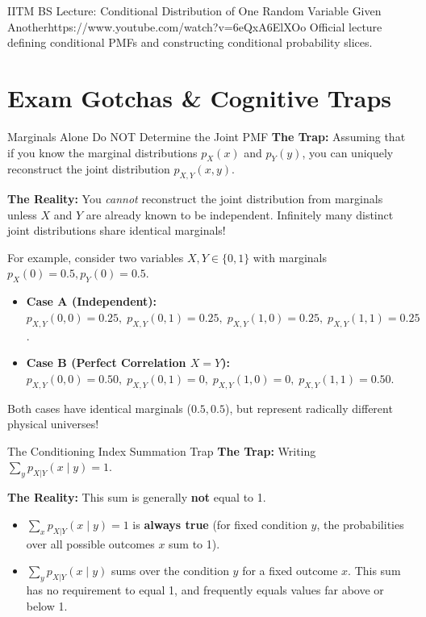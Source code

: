 \begin{videocard}{IITM BS Lecture: Conditional Distribution of One Random Variable Given Another}{https://www.youtube.com/watch?v=6eQxA6ElXOo}
Official lecture defining conditional PMFs and constructing conditional probability slices.
\end{videocard}

\section{Exam Gotchas \& Cognitive Traps}

\begin{trapbox}{Marginals Alone Do NOT Determine the Joint PMF}
\textbf{The Trap:} Assuming that if you know the marginal distributions $p_X(x)$ and $p_Y(y)$, you can uniquely reconstruct the joint distribution $p_{X,Y}(x, y)$.

\textbf{The Reality:} You \emph{cannot} reconstruct the joint distribution from marginals unless $X$ and $Y$ are already known to be independent. Infinitely many distinct joint distributions share identical marginals!

For example, consider two variables $X, Y \in \{0, 1\}$ with marginals $p_X(0)=0.5, p_Y(0)=0.5$.
\begin{itemize}
    \item \textbf{Case A (Independent):} $p_{X,Y}(0,0)=0.25, \; p_{X,Y}(0,1)=0.25, \; p_{X,Y}(1,0)=0.25, \; p_{X,Y}(1,1)=0.25$.
    \item \textbf{Case B (Perfect Correlation $X=Y$):} $p_{X,Y}(0,0)=0.50, \; p_{X,Y}(0,1)=0, \; p_{X,Y}(1,0)=0, \; p_{X,Y}(1,1)=0.50$.
\end{itemize}
Both cases have identical marginals ($0.5, 0.5$), but represent radically different physical universes!
\end{trapbox}

\begin{trapbox}{The Conditioning Index Summation Trap}
\textbf{The Trap:} Writing $\sum_y p_{X|Y}(x \mid y) = 1$.

\textbf{The Reality:} This sum is generally \textbf{not} equal to 1.
\begin{itemize}
    \item $\sum_x p_{X|Y}(x \mid y) = 1$ is \textbf{always true} (for fixed condition $y$, the probabilities over all possible outcomes $x$ sum to 1).
    \item $\sum_y p_{X|Y}(x \mid y)$ sums over the condition $y$ for a fixed outcome $x$. This sum has no requirement to equal 1, and frequently equals values far above or below 1.
\end{itemize}
\end{trapbox}


